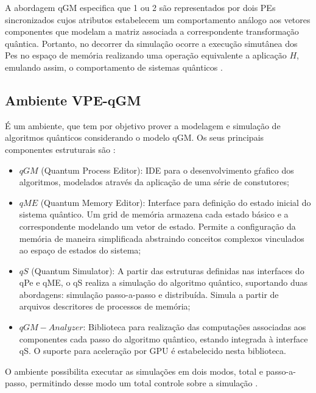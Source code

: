 \documentclass[tcc,capa]{texufpel}
\begin{document}
A abordagem qGM especifica que 1 ou 2 são representados por dois PEs sincronizados cujos atributos estabelecem um comportamento análogo aos vetores componentes que modelam a matriz associada a correspondente transformação quântica. Portanto, no decorrer da simulação ocorre a execução simutânea dos Pes no espaço de memória realizando uma operação equivalente a aplicação $H$, emulando assim, o comportamento de sistemas quânticos \cite{Schmalfuss14}.



\subsection{Ambiente VPE-qGM}

É um ambiente, que tem por objetivo prover a modelagem e simulação de algoritmos quânticos considerando o modelo qGM. Os seus principais componentes estruturais são \cite{maron:2013:ccgrid}:

\begin{itemize}
    \item $qGM$ (Quantum Process Editor): IDE para o desenvolvimento gŕafico dos algoritmos, modelados através da aplicação de uma série de constutores;
    
    \item $qME$ (Quantum Memory Editor): Interface para definição do estado inicial do sistema quântico. Um grid de memória armazena cada estado básico e a correspondente modelando um vetor de estado. Permite a configuração da memória de maneira simplificada abstraindo conceitos complexos vinculados ao espaço de estados do sistema; 
    
    \item $qS$ (Quantum Simulator): A partir das estruturas definidas nas interfaces do qPe e qME, o qS realiza a simulação do algoritmo quântico, suportando duas abordagens: simulação passo-a-passo e distribuída. Simula a partir de arquivos descritores de processos de memória;
    
    \item $qGM-Analyzer$: Biblioteca para realização das computações associadas aos componentes cada passo do algoritmo quântico, estando integrada à interface qS. O suporte para aceleração por GPU é estabelecido nesta biblioteca.
    
\end{itemize}

O ambiente possibilita executar as simulações em dois modos, total e passo-a-passo, permitindo desse modo um total controle sobre a simulação \cite{MARON10}.
\end{document}
